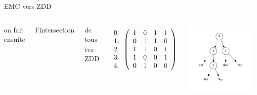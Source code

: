\documentclass{beamer}
\let\emph\alert
\begin{document}
\begin{frame}{EMC vers ZDD}
  \begin{columns}

    on fait ensuite

    l'\emph{intersection}

    de tous ces ZDD

  \begin{displaymath}
    \begin{array}{c}
      0. \\ 1. \\ 2. \\ 3. \\ 4.
    \end{array}
   \left(\begin{array}{ c c c c c }
   1 & 0 & 1 & 1 \\
   0 & 1 & 1 & 0 \\
   1 & 1 & 0 & 1 \\
   1 & 0 & 0 & 1 \\
   0 & 1 & 0 & 0
  \end{array}\right)
  \end{displaymath}

    \includegraphics[height=0.8\textheight]{imports/inter.pdf}
  \end{columns}
\end{frame}
\end{document}
